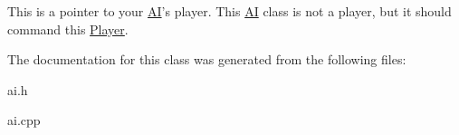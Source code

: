 This is a pointer to your \hyperlink{classAnarchy_1_1AI}{A\-I}'s player. This \hyperlink{classAnarchy_1_1AI}{A\-I} class is not a player, but it should command this \hyperlink{classAnarchy_1_1Player}{Player}. 



The documentation for this class was generated from the following files\-:\begin{DoxyCompactItemize}
\item 
ai.\-h\item 
ai.\-cpp\end{DoxyCompactItemize}
